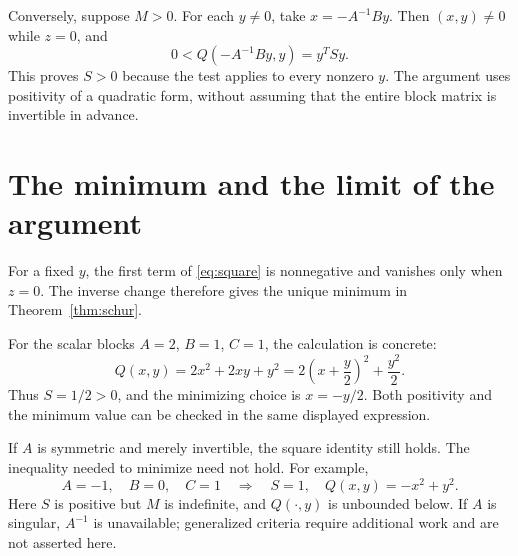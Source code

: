 \documentclass[12pt,reqno]{amsart}
\begin{document}
Conversely, suppose $M>0$. For each $y\ne0$, take $x=-A^{-1}By$.
Then $(x,y)\ne0$ while $z=0$, and
\[
 0<Q(-A^{-1}By,y)=y^TSy.
\]
This proves $S>0$ because the test applies to every nonzero $y$.
The argument uses positivity of a quadratic form, without assuming
that the entire block matrix is invertible in advance.

\section{The minimum and the limit of the argument}
For a fixed $y$, the first term of \eqref{eq:square} is nonnegative and
vanishes only when $z=0$. The inverse change therefore gives the unique
minimum in Theorem~\ref{thm:schur}.

For the scalar blocks $A=2$, $B=1$, $C=1$, the calculation is concrete:
\[
 Q(x,y)=2x^2+2xy+y^2
       =2\left(x+\frac y2\right)^2+\frac{y^2}{2}.
\]
Thus $S=1/2>0$, and the minimizing choice is $x=-y/2$. Both positivity
and the minimum value can be checked in the same displayed expression.

If $A$ is symmetric and merely invertible, the square identity still
holds. The inequality needed to minimize need not hold. For example,
\[
 A=-1,\quad B=0,\quad C=1
 \quad\Longrightarrow\quad S=1,\quad Q(x,y)=-x^2+y^2.
\]
Here $S$ is positive but $M$ is indefinite, and $Q(\cdot,y)$ is unbounded
below. If $A$ is singular, $A^{-1}$ is unavailable; generalized criteria
require additional work and are not asserted here.



\end{document}
